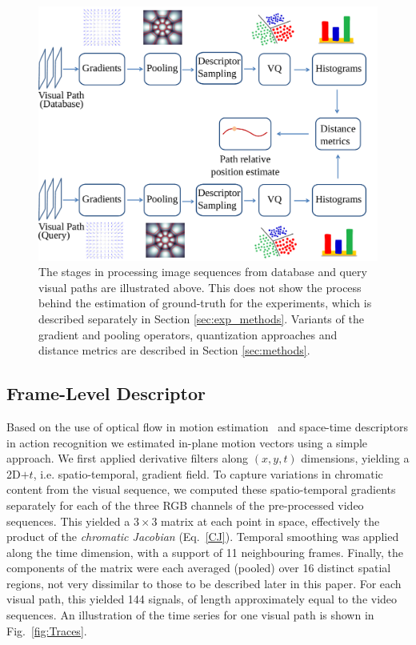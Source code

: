 \begin{figure}
\begin{center}
\includegraphics[width=\textwidth]{./gfx/Chapter04/pipeline.pdf}
\caption{The stages in processing image sequences from database and query visual paths are illustrated above.  This does not show the process behind the estimation of ground-truth for the experiments, which is described separately in Section \ref{sec:exp_methods}.  Variants of the gradient and pooling operators, quantization approaches and distance metrics are described in Section \ref{sec:methods}.}
\label{fig:FigPipeline}
\end{center}
\end{figure}

\subsection{Frame-Level Descriptor}
Based on the use of optical flow in motion estimation~\citep{Weickert2006} and space-time descriptors in action recognition \citep{Wang2009} we estimated in-plane motion vectors using a simple approach.  We first applied derivative filters along $(x,y,t)$ dimensions, yielding a 2D$+t$, i.e. spatio-temporal, gradient field.  To capture variations in chromatic content from the visual sequence, we computed these spatio-temporal gradients separately for each of the three RGB channels of the pre-processed video sequences.  This yielded a $3\times 3$ matrix at each point in space, effectively the product of the \textit{chromatic Jacobian} (Eq.~\ref{CJ}).  Temporal smoothing was applied along the time dimension, with a support of 11 neighbouring frames. Finally, the components of the matrix were each averaged (pooled) over 16 distinct spatial regions, not very dissimilar to those to be described later in this paper.   For each visual path, this yielded 144 signals, of length approximately equal to the video sequences.  An illustration of the time series for one visual path is shown in Fig.~\ref{fig:Traces}.


